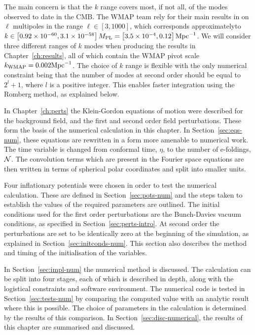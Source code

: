The main concern is that the $k$ range covers most, if not all, of the modes observed
to date in the CMB. The WMAP team rely for their main results in 
 on $\ell$ multipoles in the range $\ell \in [3, 1000]$,
which corresponds approximately\footnotemark  to $k\in \left[0.92 \times 10^{-60}, 3.1 \times
10^{-58}\right]M_{\mathrm{PL}} = \left[3.5\times 10^{-4}, 0.12\right] \mathrm{Mpc}^{-1}$.
We will consider three different ranges of $k$ modes when producing the results in
Chapter~\ref{ch:results}, all of which contain the WMAP pivot scale
$k_\mathrm{WMAP}=0.002\mathrm{Mpc}^{-1}$. The
choice of $k$ range is flexible with the only numerical constraint being that the
number of modes at second order should be equal to $2^l +1$, where $l$ is a positive
integer. This enables
faster integration using the Romberg method, as explained below. 


In Chapter~\ref{ch:perts} the Klein-Gordon equations of motion were described for the
background field, and the first and second order field perturbations. These form the
basis of the numerical calculation in this chapter. In Section~\ref{sec:eqs-num},
these equations are rewritten in a form more amenable to numerical work. The time
variable is changed from conformal time, $\eta$, to the number of e-foldings, $\mathcal{N}$.
The convolution terms which are present in the Fourier space equations are then
written in terms of spherical polar coordinates and split into smaller units. 


Four inflationary potentials were chosen in order to test the numerical calculation.
These are defined in
Section~\ref{sec:pots-num} and the steps taken to establish the values of the
required parameters are outlined. The initial conditions used for the first order
perturbations are the Bunch-Davies vacuum conditions, as specified in
Section~\ref{sec:perts-intro}. At second order the perturbations are set to be
identically zero at the beginning of the simulation, as explained in
Section~\ref{sec:initconds-num}. This section also describes the method and timing of
the initialisation of the variables.


In Section~\ref{sec:impl-num} the numerical method is discussed. The calculation can
be split into four stages, each of which is described in depth, along with the
logistical constraints and software environment. The numerical code is tested in
Section~\ref{sec:tests-num} by comparing the computed value with an analytic result
where this is possible. The choice of parameters in the calculation is determined by
the results of this comparison. In Section~\ref{sec:disc-numerical}, the results of
this chapter are summarised and discussed.


